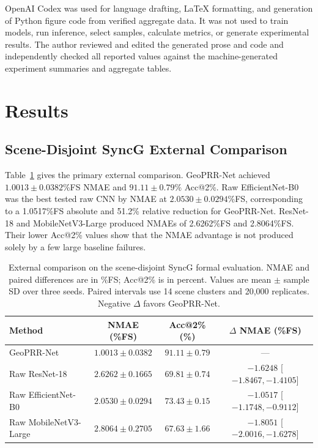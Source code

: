 \documentclass[electronics,article,submit,oneauthor]{Definitions/mdpi}
\newcommand{\modelname}{GeoPRR-Net\xspace}
\begin{document}
OpenAI Codex was used for language drafting, LaTeX formatting, and generation of Python figure code from verified aggregate data. It was not used to train models, run inference, select samples, calculate metrics, or generate experimental results. The author reviewed and edited the generated prose and code and independently checked all reported values against the machine-generated experiment summaries and aggregate tables.

\section{Results}
\label{sec:results}

\subsection{Scene-Disjoint SyncG External Comparison}
\label{subsec:syncg_results}

Table~\ref{tab:syncg_external} gives the primary external comparison. \modelname achieved $1.0013\pm0.0382$\%FS NMAE and $91.11\pm0.79$\% Acc@2\%. Raw EfficientNet-B0 was the best tested raw CNN by NMAE at $2.0530\pm0.0294$\%FS, corresponding to a 1.0517\%FS absolute and 51.2\% relative reduction for \modelname. ResNet-18 and MobileNetV3-Large produced NMAEs of 2.6262\%FS and 2.8064\%FS. Their lower Acc@2\% values show that the NMAE advantage is not produced solely by a few large baseline failures.

\begin{table}[H]
\caption{External comparison on the scene-disjoint SyncG formal evaluation. NMAE and paired differences are in \%FS; Acc@2\% is in percent. Values are mean $\pm$ sample SD over three seeds. Paired intervals use 14 scene clusters and 20,000 replicates. Negative $\Delta$ favors \modelname.}
\label{tab:syncg_external}
\centering
\small
\begin{tabularx}{\textwidth}{@{}>{\raggedright\arraybackslash}Xccc@{}}
\toprule
\textbf{Method} & \textbf{NMAE (\%FS)} & \textbf{Acc@2\% (\%)} & \textbf{$\Delta$ NMAE (\%FS)} \\
\midrule
\modelname & $1.0013\pm0.0382$ & $91.11\pm0.79$ & --- \\
Raw ResNet-18 & $2.6262\pm0.1665$ & $69.81\pm0.74$ & $-1.6248$ [$-1.8467,-1.4105$] \\
Raw EfficientNet-B0 & $2.0530\pm0.0294$ & $73.43\pm0.15$ & $-1.0517$ [$-1.1748,-0.9112$] \\
Raw MobileNetV3-Large & $2.8064\pm0.2705$ & $67.63\pm1.66$ & $-1.8051$ [$-2.0016,-1.6278$] \\
\bottomrule
\end{tabularx}
\end{table}
\end{document}
